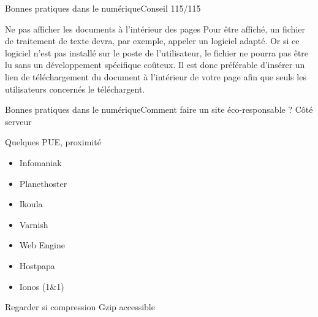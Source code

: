 \begin{frame}{Bonnes pratiques dans le numérique}{Conseil 115/115}
\begin{block}{Ne pas afficher les documents à l'intérieur des pages}
Pour être affiché, un fichier de traitement de texte devra, par exemple, appeler un logiciel adapté. Or si ce logiciel n'est pas installé sur le poste de l'utilisateur, le fichier ne pourra pas être lu sans un développement spécifique coûteux. Il est donc préférable d'insérer un lien de téléchargement du document à l'intérieur de votre page afin que seuls les utilisateurs concernés le téléchargent.
\end{block}

\end{frame}

\begin{frame}{Bonnes pratiques dans le numérique}{Comment faire un site éco-responsable ? Côté serveur}
\begin{block}{Quelques PUE, proximité}

\begin{minipage}[b]{0.6\linewidth}

\begin{itemize}
\item Infomaniak
\item Planethoster
\item Ikoula
\item Varnish
\item Web Engine
\item Hostpapa 
\item Ionos (1\&1)
\end{itemize}
Regarder si compression Gzip accessible


\end{minipage}
\end{block}
\end{frame}
